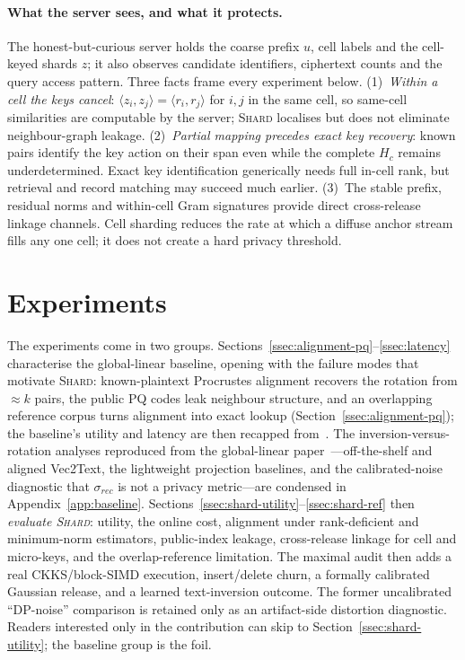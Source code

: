 \documentclass[11pt,a4paper]{article}
\begin{document}
\paragraph{What the server sees, and what it protects.} The honest-but-curious
server holds the coarse prefix $u$, cell labels and the cell-keyed shards $z$;
it also observes candidate identifiers, ciphertext counts and the query access
pattern. Three facts
frame every experiment below. (1)~\emph{Within a cell the keys cancel}:
$\langle z_i,z_j\rangle=\langle r_i,r_j\rangle$ for $i,j$ in the same cell,
so same-cell similarities are computable by the server; \textsc{Shard}
localises but does not eliminate neighbour-graph leakage. (2)~\emph{Partial
mapping precedes exact key recovery}: known pairs identify the key action on
their span even while the complete $H_c$ remains underdetermined. Exact key
identification generically needs full in-cell rank, but retrieval and record
matching may succeed much earlier. (3)~The stable prefix, residual norms and
within-cell Gram signatures provide direct cross-release linkage channels.
Cell sharding reduces the rate at which a diffuse anchor stream fills any one
cell; it does not create a hard privacy threshold.

\section{Experiments}\label{sec:experiments}

The experiments come in two groups. Sections~\ref{ssec:alignment-pq}--\ref{ssec:latency} characterise the
global-linear baseline, opening with the failure modes that motivate
\textsc{Shard}: known-plaintext Procrustes alignment recovers the rotation
from $\approx k$ pairs, the public PQ codes leak neighbour structure, and an
overlapping reference corpus turns alignment into exact lookup
(Section~\ref{ssec:alignment-pq}); the baseline's utility and latency are
then recapped from~\cite{ref_vkit,ref_alpha}. The
inversion-versus-rotation analyses reproduced from the global-linear
paper~\cite{ref_alpha}---off-the-shelf and aligned Vec2Text, the
lightweight projection baselines, and the calibrated-noise diagnostic
that $\sigma_{rec}$ is not a privacy metric---are condensed in
Appendix~\ref{app:baseline}. Sections~\ref{ssec:shard-utility}--\ref{ssec:shard-ref}
then \emph{evaluate \textsc{Shard}}: utility, the online cost, alignment
under rank-deficient and minimum-norm estimators, public-index leakage,
cross-release linkage for cell and micro-keys, and the overlap-reference
limitation. The maximal audit then adds a real CKKS/block-SIMD execution,
insert/delete churn, a formally calibrated Gaussian release, and a learned
text-inversion outcome. The former uncalibrated ``DP-noise'' comparison is
retained only as an artifact-side distortion diagnostic.
Readers interested only in the contribution can skip to
Section~\ref{ssec:shard-utility}; the baseline group is the foil.
\end{document}
